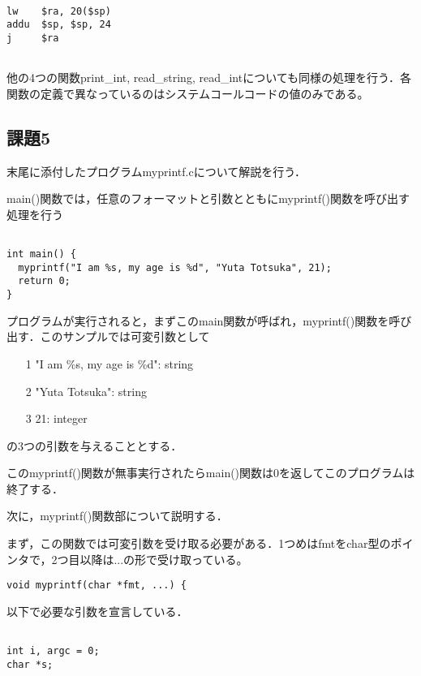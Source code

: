 \documentclass[a4j]{jarticle}
\begin{document}
{\baselineskip 3mm
  \begin{verbatim}

lw    $ra, 20($sp)
addu  $sp, $sp, 24
j     $ra


  \end{verbatim}
}

他の4つの関数print\_int, read\_string, read\_intについても同様の処理を行う．各関数の定義で異なっているのはシステムコールコードの値のみである。



\subsection{課題5}

末尾に添付したプログラムmyprintf.cについて解説を行う．

main()関数では，任意のフォーマットと引数とともにmyprintf()関数を呼び出す処理を行う

{\baselineskip 3mm
  \begin{verbatim}

int main() {
  myprintf("I am %s, my age is %d", "Yuta Totsuka", 21);
  return 0;
}

\end{verbatim}
}

プログラムが実行されると，まずこのmain関数が呼ばれ，myprintf()関数を呼び出す．このサンプルでは可変引数として

\begin{itemize}
\item[1]"I am \%s, my age is \%d": string
\item[2]"Yuta Totsuka": string
\item[3]21: integer
\end{itemize}

の3つの引数を与えることとする．

このmyprintf()関数が無事実行されたらmain()関数は0を返してこのプログラムは終了する．


次に，myprintf()関数部について説明する．

まず，この関数では可変引数を受け取る必要がある．1つめはfmtをchar型のポインタで，2つ目以降は...の形で受け取っている。

\begin{verbatim}
void myprintf(char *fmt, ...) {
\end{verbatim}

以下で必要な引数を宣言している．

{\baselineskip 3mm
  \begin{verbatim}

int i, argc = 0;
char *s;

\end{verbatim}
}
\end{document}
